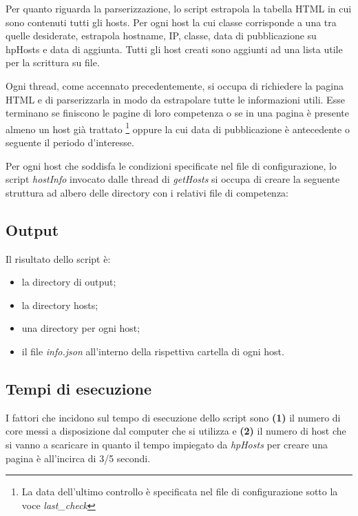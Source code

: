 \documentclass[a4paper, 11pt, oneside]{report}
\begin{document}
Per quanto riguarda la parserizzazione, lo script estrapola la tabella HTML in cui sono contenuti tutti gli hosts. Per ogni host la cui classe corrisponde a una tra quelle desiderate, estrapola hostname, IP, classe, data di pubblicazione su hpHosts e data di aggiunta. Tutti gli host creati sono aggiunti ad una lista utile per la scrittura su file.

Ogni thread, come accennato precedentemente, si occupa di richiedere la pagina HTML e di parserizzarla in modo da estrapolare tutte le informazioni utili. Esse terminano se finiscono le pagine di loro competenza o se in una pagina è presente almeno un host già trattato \footnote{La data dell'ultimo controllo è specificata nel file di configurazione sotto la voce \textit{last\_check}}  oppure la cui data di pubblicazione è antecedente o seguente il periodo d'interesse.

Per ogni host che soddisfa le condizioni specificate nel file di configurazione, lo script \textit{hostInfo} invocato dalle thread di \textit{getHosts} si occupa di creare la seguente struttura ad albero delle directory con i relativi file di competenza:\\
\label{dir}

\subsection{Output}
Il risultato dello script è:
\begin{itemize}
\item la directory di output;
\item la directory hosts;
\item una directory per ogni host;
\item il file \textit{info.json} all'interno della rispettiva cartella di ogni host.
\end{itemize}	

\subsection{Tempi di esecuzione}
I fattori che incidono sul tempo di esecuzione dello script sono \textbf{(1)} il numero di core messi a disposizione dal computer che si utilizza e \textbf{(2)} il numero di host che si vanno a scaricare in quanto il tempo impiegato da \textit{hpHosts} per creare una pagina è all'incirca di 3/5 secondi.
\end{document}

